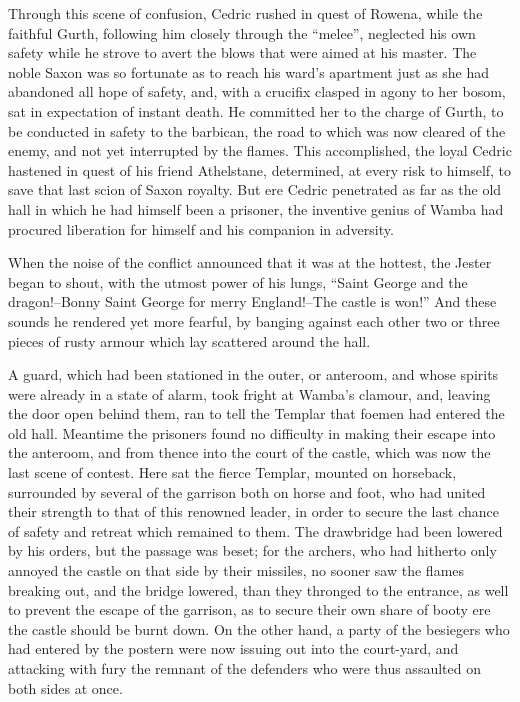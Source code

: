 Through this scene of confusion, Cedric rushed in quest of Rowena, while
the faithful Gurth, following him closely through the ``melee'',
neglected his own safety while he strove to avert the blows that were
aimed at his master. The noble Saxon was so fortunate as to reach his
ward's apartment just as she had abandoned all hope of safety, and, with
a crucifix clasped in agony to her bosom, sat in expectation of instant
death. He committed her to the charge of Gurth, to be conducted in
safety to the barbican, the road to which was now cleared of the enemy,
and not yet interrupted by the flames. This accomplished, the loyal
Cedric hastened in quest of his friend Athelstane, determined, at every
risk to himself, to save that last scion of Saxon royalty. But ere
Cedric penetrated as far as the old hall in which he had himself been a
prisoner, the inventive genius of Wamba had procured liberation for
himself and his companion in adversity.

When the noise of the conflict announced that it was at the hottest, the
Jester began to shout, with the utmost power of his lungs, ``Saint
George and the dragon!--Bonny Saint George for merry England!--The
castle is won!'' And these sounds he rendered yet more fearful, by
banging against each other two or three pieces of rusty armour which lay
scattered around the hall.

A guard, which had been stationed in the outer, or anteroom, and whose
spirits were already in a state of alarm, took fright at Wamba's
clamour, and, leaving the door open behind them, ran to tell the Templar
that foemen had entered the old hall. Meantime the prisoners found no
difficulty in making their escape into the anteroom, and from thence
into the court of the castle, which was now the last scene of contest.
Here sat the fierce Templar, mounted on horseback, surrounded by several
of the garrison both on horse and foot, who had united their strength to
that of this renowned leader, in order to secure the last chance of
safety and retreat which remained to them. The drawbridge had been
lowered by his orders, but the passage was beset; for the archers, who
had hitherto only annoyed the castle on that side by their missiles, no
sooner saw the flames breaking out, and the bridge lowered, than they
thronged to the entrance, as well to prevent the escape of the garrison,
as to secure their own share of booty ere the castle should be burnt
down. On the other hand, a party of the besiegers who had entered by the
postern were now issuing out into the court-yard, and attacking with
fury the remnant of the defenders who were thus assaulted on both sides
at once.

